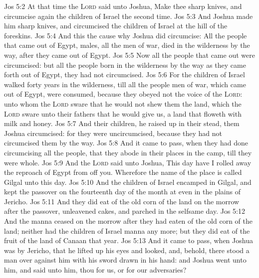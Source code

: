 \vs Jos 5:2 At that time the \textsc{Lord} said unto Joshua, Make thee sharp knives, and circumcise again the children of Israel the second time.
\vs Jos 5:3 And Joshua made him sharp knives, and circumcised the children of Israel at the hill of the foreskins.
\vs Jos 5:4 And this  the cause why Joshua did circumcise: All the people that came out of Egypt,  males,  all the men of war, died in the wilderness by the way, after they came out of Egypt.
\vs Jos 5:5 Now all the people that came out were circumcised: but all the people  born in the wilderness by the way as they came forth out of Egypt,  they had not circumcised.
\vs Jos 5:6 For the children of Israel walked forty years in the wilderness, till all the people  men of war, which came out of Egypt, were consumed, because they obeyed not the voice of the \textsc{Lord}: unto whom the \textsc{Lord} sware that he would not shew them the land, which the \textsc{Lord} sware unto their fathers that he would give us, a land that floweth with milk and honey.
\vs Jos 5:7 And their children,  he raised up in their stead, them Joshua circumcised: for they were uncircumcised, because they had not circumcised them by the way.
\vs Jos 5:8 And it came to pass, when they had done circumcising all the people, that they abode in their places in the camp, till they were whole.
\vs Jos 5:9 And the \textsc{Lord} said unto Joshua, This day have I rolled away the reproach of Egypt from off you. Wherefore the name of the place is called Gilgal unto this day.
\vs Jos 5:10 And the children of Israel encamped in Gilgal, and kept the passover on the fourteenth day of the month at even in the plains of Jericho.
\vs Jos 5:11 And they did eat of the old corn of the land on the morrow after the passover, unleavened cakes, and parched  in the selfsame day.
\vs Jos 5:12 And the manna ceased on the morrow after they had eaten of the old corn of the land; neither had the children of Israel manna any more; but they did eat of the fruit of the land of Canaan that year.
\vs Jos 5:13 And it came to pass, when Joshua was by Jericho, that he lifted up his eyes and looked, and, behold, there stood a man over against him with his sword drawn in his hand: and Joshua went unto him, and said unto him,  thou for us, or for our adversaries?
